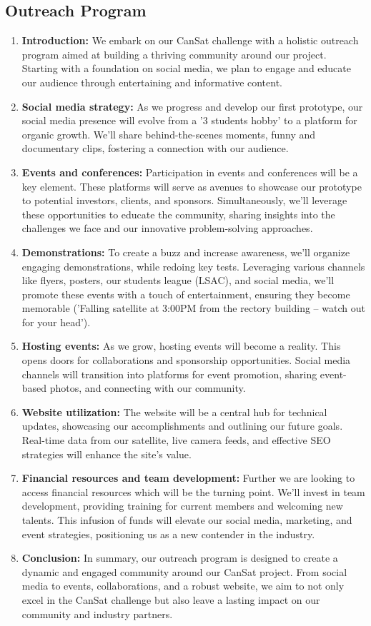 \documentclass[11pt]{article}
\begin{document}
\subsection{Outreach Program}
\begin{enumerate}
\item \textbf{Introduction:} {We embark on our CanSat challenge with a holistic outreach program aimed at building a thriving community around our project. Starting with a foundation on social media, we plan to engage and educate our audience through entertaining and informative content.}
\item \textbf{Social media strategy:} {As we progress and develop our first prototype, our social media presence will evolve from a '3 students hobby' to a platform for organic growth. We'll share behind-the-scenes moments, funny and documentary clips, fostering a connection with our audience.}
\item \textbf{Events and conferences:} {Participation in events and conferences will be a key element. These platforms will serve as avenues to showcase our prototype to potential investors, clients, and sponsors. Simultaneously, we'll leverage these opportunities to educate the community, sharing insights into the challenges we face and our innovative problem-solving approaches.}
\item \textbf{Demonstrations:} {To create a buzz and increase awareness, we'll organize engaging demonstrations, while redoing key tests. Leveraging various channels like flyers, posters, our students league (LSAC), and social media, we'll promote these events with a touch of entertainment, ensuring they become memorable ('Falling satellite at 3:00PM from the rectory building – watch out for your head').}
\item \textbf{Hosting events:} {As we grow, hosting events will become a reality. This opens doors for collaborations and sponsorship opportunities. Social media channels will transition into platforms for event promotion, sharing event-based photos, and connecting with our community.}
\item \textbf{Website utilization:} {The website will be a central hub for technical updates, showcasing our accomplishments and outlining our future goals. Real-time data from our satellite, live camera feeds, and effective SEO strategies will enhance the site's value.}
\item \textbf{Financial resources and team development:} {Further we are looking to access financial resources which will be the turning point. We'll invest in team development, providing training for current members and welcoming new talents. This infusion of funds will elevate our social media, marketing, and event strategies, positioning us as a new contender in the industry.}
\item \textbf{Conclusion:} {In summary, our outreach program is designed to create a dynamic and engaged community around our CanSat project. From social media to events, collaborations, and a robust website, we aim to not only excel in the CanSat challenge but also leave a lasting impact on our community and industry partners.}
\end{enumerate}
\end{document}
